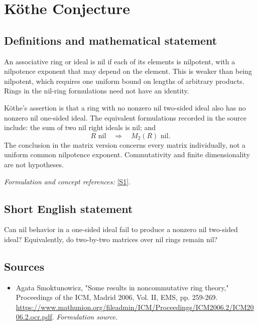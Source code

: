 \documentclass[11pt]{article}
\begin{document}
\section*{\texorpdfstring{Köthe Conjecture}{Köthe Conjecture}}\label{1103}
\subsection{Definitions and mathematical statement}
An associative ring or ideal is nil if each of its elements is nilpotent, with a nilpotence exponent that may depend on the element. This is weaker than being nilpotent, which requires one uniform bound on lengths of arbitrary products. Rings in the nil-ring formulations need not have an identity.

K\"othe's assertion is that a ring with no nonzero nil two-sided ideal also has no nonzero nil one-sided ideal. The equivalent formulations recorded in the source include: the sum of two nil right ideals is nil; and
\[
 R\text{ nil}\quad\Longrightarrow\quad M_2(R)\text{ nil}.
\]
The conclusion in the matrix version concerns every matrix individually, not a uniform common nilpotence exponent. Commutativity and finite dimensionality are not hypotheses.
\par\smallskip\textit{Formulation and concept references:} \href{https://www.mathunion.org/fileadmin/ICM/Proceedings/ICM2006.2/ICM2006.2.ocr.pdf}{[S1]}.

\subsection{Short English statement}
Can nil behavior in a one-sided ideal fail to produce a nonzero nil two-sided ideal? Equivalently, do two-by-two matrices over nil rings remain nil?
\subsection{Sources}
\begin{itemize}
\item[S1]Agata Smoktunowicz, "Some results in noncommutative ring theory," Proceedings of the ICM, Madrid 2006, Vol. II, EMS, pp. 259-269.
\url{https://www.mathunion.org/fileadmin/ICM/Proceedings/ICM2006.2/ICM2006.2.ocr.pdf}.
\textit{Formulation source.}
\end{itemize}
\end{document}
